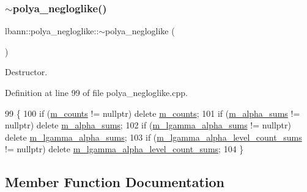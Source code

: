 \subsubsection{\texorpdfstring{$\sim$polya\+\_\+negloglike()}{~polya\_negloglike()}}
{\footnotesize\ttfamily lbann\+::polya\+\_\+negloglike\+::$\sim$polya\+\_\+negloglike (\begin{DoxyParamCaption}{ }\end{DoxyParamCaption})\hspace{0.3cm}{\ttfamily [override]}}

Destructor. 

Definition at line 99 of file polya\+\_\+negloglike.\+cpp.


\begin{DoxyCode}
99                                     \{
100   \textcolor{keywordflow}{if} (\hyperlink{classlbann_1_1polya__negloglike_a441387814cd7deafb1f70c91926d3004}{m\_counts} != \textcolor{keyword}{nullptr}) \textcolor{keyword}{delete} \hyperlink{classlbann_1_1polya__negloglike_a441387814cd7deafb1f70c91926d3004}{m\_counts};
101   \textcolor{keywordflow}{if} (\hyperlink{classlbann_1_1polya__negloglike_aa77620f256de700ae8b3ca921957bcd1}{m\_alpha\_sums} != \textcolor{keyword}{nullptr}) \textcolor{keyword}{delete} \hyperlink{classlbann_1_1polya__negloglike_aa77620f256de700ae8b3ca921957bcd1}{m\_alpha\_sums};
102   \textcolor{keywordflow}{if} (\hyperlink{classlbann_1_1polya__negloglike_a0aec768ffa50a8b716149d597699eddb}{m\_lgamma\_alpha\_sums} != \textcolor{keyword}{nullptr}) \textcolor{keyword}{delete} 
      \hyperlink{classlbann_1_1polya__negloglike_a0aec768ffa50a8b716149d597699eddb}{m\_lgamma\_alpha\_sums};
103   \textcolor{keywordflow}{if} (\hyperlink{classlbann_1_1polya__negloglike_a78c9da1fb83c7b79a12cfbf30a4cb59e}{m\_lgamma\_alpha\_level\_count\_sums} != \textcolor{keyword}{nullptr}) \textcolor{keyword}{delete} 
      \hyperlink{classlbann_1_1polya__negloglike_a78c9da1fb83c7b79a12cfbf30a4cb59e}{m\_lgamma\_alpha\_level\_count\_sums};
104 \}
\end{DoxyCode}


\subsection{Member Function Documentation}
\mbox{\label{classlbann_1_1polya__negloglike_a526b3229a4143359c041f8d88b0a729b}} 
